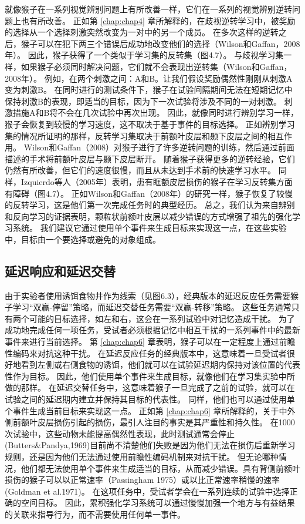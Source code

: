 就像猴子在一系列视觉辨别问题上有所改善一样，它们在一系列的视觉辨别逆转问题上也有所改善。
正如第 \ref{chap:chap4} 章所解释的，在歧视逆转学习中，被奖励的选择从一个选择刺激突然改变为一对中的另一个成员。
在多次这样的逆转之后，猴子可以在犯下两三个错误后成功地改变他们的选择（Wilson和Gaffan，2008年）。
因此，猴子获得了一个类似于学习集的反转集（图4.7）。
与歧视学习集一样，如果猴子必须同时解决问题，它们就不会表现出逆转集（Wilson和Gaffan，2008年）。
例如，在两个刺激之间：A和B。让我们假设奖励偶然性刚刚从刺激A变为刺激B。
在同时进行的测试条件下，猴子在试验间隔期间无法在短期记忆中保持刺激B的表现，即适当的目标，因为下一次试验将涉及不同的一对刺激。
刺激措施A和B将不会在几次试验中再次出现。
因此，就像同时进行辨别学习一样，猴子会恢复到较慢的学习速度，这不取决于基于事件的目标选择。
正如辨别学习集的情况所证明的那样，反转学习集取决于前额叶皮层和颞下皮层之间的相互作用。
Wilson和Gaffan（2008）对猴子进行了许多逆转问题的训练，然后通过前面描述的手术将前额叶皮层与颞下皮层断开。
随着猴子获得更多的逆转经验，它们仍然有所改善，但它们的速度很慢，而且从未达到手术前的快速学习水平。
同样，Izquierdo等人（2005年）表明，患有眶额皮层损伤的猴子在学习反转集方面有障碍（图4.7）。
正如Wilson和Gaffan（2008年）的研究一样，猴子恢复了较慢的反转学习，这是他们第一次完成任务时的典型经历。
总之，我们认为来自辨别和反向学习的证据表明，颗粒状前额叶皮层以减少错误的方式增强了祖先的强化学习系统。
我们建议它通过使用单个事件来生成目标来实现这一点，在这些实验中，目标由一个要选择或避免的对象组成。


\subsection{延迟响应和延迟交替}


由于实验者使用诱饵食物井作为线索（见图6.3），经典版本的延迟反应任务需要猴子学习“双赢-停留”策略，而延迟交替任务需要“双赢-转移”策略。
这些任务通常只有两个可能的目标选择，如左和右，这会在一系列试验中对记忆造成干扰。
为了成功地完成任何一项任务，受试者必须根据记忆中相互干扰的一系列事件中的最新事件来进行当前选择。
第 \ref{chap:chap6} 章表明，猴子可以在一定程度上通过前瞻性编码来对抗这种干扰。
在延迟反应任务的经典版本中，这意味着一旦受试者很好地看到左侧或右侧食物的诱饵，他们就可以在试验延迟期内保持对该位置的代表性作为目标。
因此，他们使用单个事件来生成目标，就像他们在学习集实验中所做的那样。
在延迟交替任务中，这意味着猴子一旦完成了之前的试验，就可以在试验之间的延迟期内建立并保持其目标的代表性。
同样，他们也可以通过使用单个事件生成当前目标来实现这一点。
正如第 \ref{chap:chap6} 章所解释的，关于中外侧前额叶皮层损伤引起的损伤，最引人注目的事实是其严重性和持久性。
在1000次试验中，这些动物未能提高偶然性表现，此时测试通常会停止(Butters\&Pandya,1969)目前尚不清楚他们失败是因为他们无法在损伤后重新学习规则，还是因为他们无法通过使用前瞻性编码机制来对抗干扰。
但无论哪种情况，他们都无法使用单个事件来生成适当的目标，从而减少错误。具有背侧前额叶损伤的猴子可以以正常速率（Passingham 1975）或以比正常速率稍慢的速率(Goldman et al.1971)。
在这项任务中，受试者学会在一系列连续的试验中选择正确的空间目标。
因此，累积强化学习系统可以通过慢慢加强一个地方与有益结果的关联来指导行为，而不需要使用任何单一事件。


